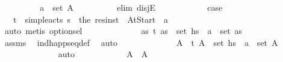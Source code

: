 \begin{isabellebody}
\ \ \ \ \ \ \isamarkupfalse%
\ \isamarkupfalse%
\ {\isachardoublequoteopen}a\ {\isasymin}\ set\ A{\isachardoublequoteclose}\isanewline
\ \ \ \ \ \ \ \ \isamarkupfalse%
\ {\isacharparenleft}{\kern0pt}elim\ disjE{\isacharparenright}{\kern0pt}\isanewline
\ \ \ \ \ \ \ \ \ \ \isamarkupfalse%
\ {\isacharquery}{\kern0pt}case{}\isanewline
\ \ \ \ \ \ \ \ \ \ \isamarkupfalse%
\ \isamarkupfalse%
\ {\isasympi}\ \ {\isachardoublequoteopen}{\isacharparenleft}{\kern0pt}t{\isacharcomma}{\kern0pt}{\isasympi}{\isacharparenright}{\kern0pt}\ {\isasymin}\ simple{\isacharunderscore}{\kern0pt}acts\ {\isasympi}s{\isachardoublequoteclose}\ \ {\isachardoublequoteopen}the\ {\isacharparenleft}{\kern0pt}res{\isacharunderscore}{\kern0pt}inst\ {\isasympi}\ At{\isacharunderscore}{\kern0pt}Start{\isacharparenright}{\kern0pt}\ {\isacharequal}{\kern0pt}\ a{\isachardoublequoteclose}\isanewline
\ \ \ \ \ \ \ \ \ \ \ \ \isamarkupfalse%
\ auto\ {\isacharparenleft}{\kern0pt}metis\ option{\isachardot}{\kern0pt}sel{\isacharparenright}{\kern0pt}\isanewline
\ \ \ \ \ \ \ \ \ \ \isamarkupfalse%
\ \isamarkupfalse%
\ {\isachardoublequoteopen}{\isasymexists}as{\isachardot}{\kern0pt}\ {\isacharparenleft}{\kern0pt}t{\isacharcomma}{\kern0pt}\ as{\isacharparenright}{\kern0pt}\ {\isasymin}\ set\ hs\ {\isasymand}\ a\ {\isasymin}\ set\ as{\isachardoublequoteclose}\isanewline
\ \ \ \ \ \ \ \ \ \ \ \ \isamarkupfalse%
\ assms\ \isamarkupfalse%
\ ind{\isacharunderscore}{\kern0pt}happ{\isacharunderscore}{\kern0pt}seq{\isacharunderscore}{\kern0pt}def\ \isamarkupfalse%
\ auto\isanewline
\ \ \ \ \ \ \ \ \ \ \isamarkupfalse%
\ \isamarkupfalse%
\ A{\isacharprime}{\kern0pt}\ \ {\isachardoublequoteopen}{\isacharparenleft}{\kern0pt}t{\isacharcomma}{\kern0pt}\ A{\isacharprime}{\kern0pt}{\isacharparenright}{\kern0pt}\ {\isasymin}\ set\ hs{\isachardoublequoteclose}\ \ {\isachardoublequoteopen}a\ {\isasymin}\ set\ A{\isacharprime}{\kern0pt}{\isachardoublequoteclose}\isanewline
\ \ \ \ \ \ \ \ \ \ \ \ \isamarkupfalse%
\ auto\isanewline
\ \ \ \ \ \ \ \ \ \ \isamarkupfalse%
\ {\isachardoublequoteopen}A\ {\isacharequal}{\kern0pt}\ A{\isacharprime}{\kern0pt}{\isachardoublequoteclose}\isanewline
\ \ \ \ \ \ \ \ \ \ \ \ \isamarkupfalse%

\end{isabellebody}
